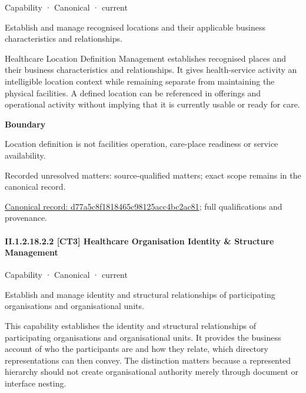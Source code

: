\label{element:d77a5c8f1818465c98125acc4bc2ac81}
{\small Capability · Canonical · current}\par

Establish and manage recognised locations and their applicable business characteristics and relationships.



Healthcare Location Definition Management establishes recognised places and their business characteristics and relationships. It gives health-service activity an intelligible location context while remaining separate from maintaining the physical facilities. A defined location can be referenced in offerings and operational activity without implying that it is currently usable or ready for care.



\textbf{Boundary}



Location definition is not facilities operation, care-place readiness or service availability.


{\small Recorded unresolved matters: source-qualified matters; exact scope remains in the canonical record.}\par
{\footnotesize \href{../../../../continuum/strategy/capability/d77a5c8f1818465c98125acc4bc2ac81.md}{Canonical record: d77a5c8f1818465c98125acc4bc2ac81}; full qualifications and provenance.}\par
\paragraph*{II.1.2.18.2.2 [CT3] Healthcare Organisation Identity \& Structure Management}
\label{navigation:II.1.2.18.2.2}

\label{element:4684348b4d144e61aa7dd203facfebdd}
{\small Capability · Canonical · current}\par

Establish and manage identity and structural relationships of participating organisations and organisational units.



This capability establishes the identity and structural relationships of participating organisations and organisational units. It provides the business account of who the participants are and how they relate, which directory representations can then convey. The distinction matters because a represented hierarchy should not create organisational authority merely through document or interface nesting.



